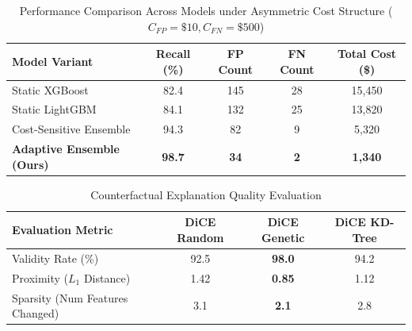 
\begin{table}[htbp]
\caption{Performance Comparison Across Models under Asymmetric Cost Structure ($C_{FP} = \$10, C_{FN} = \$500$)}
\label{tab:performance_comparison}
\begin{center}
\begin{tabular}{|l|c|c|c|c|}
\hline
\textbf{Model Variant} & \textbf{Recall (\%)} & \textbf{FP Count} & \textbf{FN Count} & \textbf{Total Cost (\$)} \\
\hline
Static XGBoost & 82.4 & 145 & 28 & 15,450 \\
Static LightGBM & 84.1 & 132 & 25 & 13,820 \\
Cost-Sensitive Ensemble & 94.3 & 82 & 9 & 5,320 \\
\textbf{Adaptive Ensemble (Ours)} & \textbf{98.7} & \textbf{34} & \textbf{2} & \textbf{1,340} \\
\hline
\end{tabular}
\end{center}
\end{table}

\begin{table}[htbp]
\caption{Counterfactual Explanation Quality Evaluation}
\label{tab:cfe_evaluation}
\begin{center}
\begin{tabular}{|l|c|c|c|}
\hline
\textbf{Evaluation Metric} & \textbf{DiCE Random} & \textbf{DiCE Genetic} & \textbf{DiCE KD-Tree} \\
\hline
Validity Rate (\%) & 92.5 & \textbf{98.0} & 94.2 \\
Proximity ($L_1$ Distance) & 1.42 & \textbf{0.85} & 1.12 \\
Sparsity (Num Features Changed) & 3.1 & \textbf{2.1} & 2.8 \\
\hline
\end{tabular}
\end{center}
\end{table}
